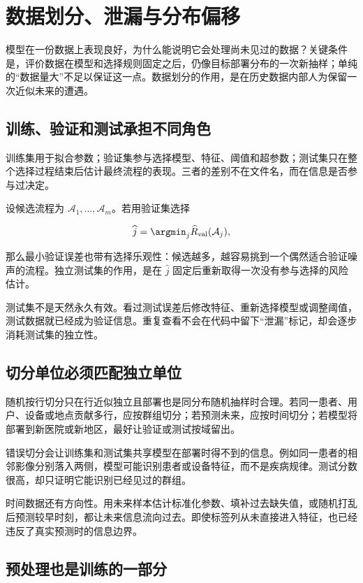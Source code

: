 \section{数据划分、泄漏与分布偏移}

模型在一份数据上表现良好，为什么能说明它会处理尚未见过的数据？关键条件是，评价数据在模型和选择规则固定之后，仍像目标部署分布的一次新抽样；单纯的``数据量大''不足以保证这一点。数据划分的作用，是在历史数据内部人为保留一次近似未来的遭遇。

\subsection{训练、验证和测试承担不同角色}

训练集用于拟合参数；验证集参与选择模型、特征、阈值和超参数；测试集只在整个选择过程结束后估计最终流程的表现。三者的差别不在文件名，而在信息是否参与过决定。

设候选流程为 \(\mathcal A_1,\ldots,\mathcal A_m\)。若用验证集选择

\[
\widehat j=\argmin_j \widehat R_{\mathrm{val}}(\mathcal A_j),
\]

那么最小验证误差也带有选择乐观性：候选越多，越容易挑到一个偶然适合验证噪声的流程。独立测试集的作用，是在 \(\widehat j\) 固定后重新取得一次没有参与选择的风险估计。

测试集不是天然永久有效。看过测试误差后修改特征、重新选择模型或调整阈值，测试数据就已经成为验证信息。重复查看不会在代码中留下``泄漏''标记，却会逐步消耗测试集的独立性。

\subsection{切分单位必须匹配独立单位}

随机按行切分只在行近似独立且部署也是同分布随机抽样时合理。若同一患者、用户、设备或地点贡献多行，应按群组切分；若预测未来，应按时间切分；若模型将部署到新医院或新地区，最好让验证或测试按域留出。

错误切分会让训练集和测试集共享模型在部署时得不到的信息。例如同一患者的相邻影像分别落入两侧，模型可能识别患者或设备特征，而不是疾病规律。测试分数很高，却只证明它能识别已经见过的群组。

时间数据还有方向性。用未来样本估计标准化参数、填补过去缺失值，或随机打乱后预测较早时刻，都让未来信息流向过去。即使标签列从未直接进入特征，也已经违反了真实预测时的信息边界。

\subsection{预处理也是训练的一部分}

